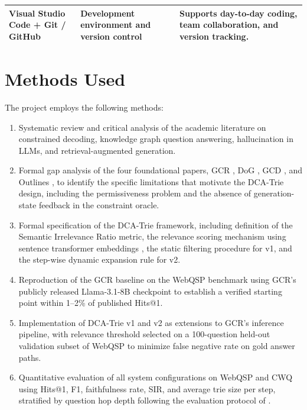 \begin{table}[H]
{\begin{tabular}{|>{\raggedright\arraybackslash}p{}|>{\raggedright\arraybackslash}p{}|>{\raggedright\arraybackslash}p{}|}
      \hline
      Visual Studio Code + Git / GitHub        & Development environment and version control                                                                       & Supports day-to-day coding, team collaboration, and version tracking.                                                           \\
      \hline
    \end{tabular}
  }
\end{table}


\section{Methods Used}

The project employs the following methods:

\begin{enumerate}[label=\roman*.]
  \item Systematic review and critical analysis of the academic literature on constrained decoding, knowledge graph question answering, hallucination in LLMs, and retrieval-augmented generation.
  \item Formal gap analysis of the four foundational papers, GCR \citep{luo2025-graph-constrained-reasoning}, DoG \citep{li2024-decoding-on-graphs}, GCD \citep{geng2023grammarconstrained}, and Outlines \citep{willard2023outlines}, to identify the specific limitations that motivate the DCA-Trie design, including the permissiveness problem and the absence of generation-state feedback in the constraint oracle.
  \item Formal specification of the DCA-Trie framework, including definition of the Semantic Irrelevance Ratio metric, the relevance scoring mechanism using sentence transformer embeddings \citep{reimers2019sbert}, the static filtering procedure for v1, and the step-wise dynamic expansion rule for v2.
  \item Reproduction of the GCR baseline on the WebQSP benchmark using GCR's publicly released Llama-3.1-8B checkpoint to establish a verified starting point within 1--2\% of published Hits@1.
  \item Implementation of DCA-Trie v1 and v2 as extensions to GCR's inference pipeline, with relevance threshold selected on a 100-question held-out validation subset of WebQSP to minimize false negative rate on gold answer paths.
  \item Quantitative evaluation of all system configurations on WebQSP and CWQ using Hits@1, F1, faithfulness rate, SIR, and average trie size per step, stratified by question hop depth following the evaluation protocol of \citet{lan2022survey}.

\end{enumerate}
